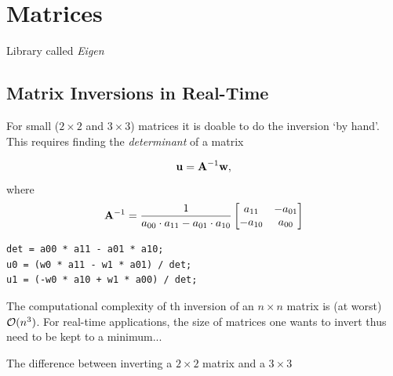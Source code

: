 \section{Matrices}\label{sec:realTimeMatrices}

Library called \textit{Eigen} \cite{Eigen}

\subsection{Matrix Inversions in Real-Time}\label{sec:RTmatrixInversion}
For small ($2\times 2$ and $3\times 3$) matrices it is doable to do the inversion `by hand'. This requires finding the \textit{determinant} of a matrix

\begin{equation*}
    \mathbf{u} = \mathbf{A}^{-1}\mathbf{w}, 
\end{equation*}
where
\begin{equation}
    \mathbf{A}^{-1} = \frac{1}{a_{00}\cdot a_{11} - a_{01}\cdot a_{10}}
    \begin{bmatrix}
        a_{11} & -a_{01}\\
        -a_{10} & a_{00} 
    \end{bmatrix}
\end{equation}

\setlstCpp
\begin{lstlisting}
det = a00 * a11 - a01 * a10;
u0 = (w0 * a11 - w1 * a01) / det;
u1 = (-w0 * a10 + w1 * a00) / det;
\end{lstlisting}


The computational complexity of th inversion of an $n\times n$ matrix is (at worst) $\mathcal{O}(n^3)$. For real-time applications, the size of matrices one wants to invert thus need to be kept to a minimum...

The difference between inverting a $2\times 2$ matrix and a $3\times 3$ 